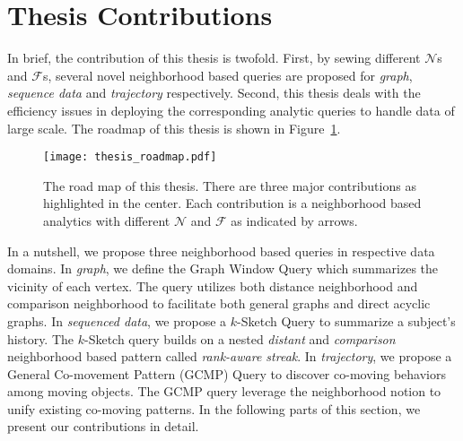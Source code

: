 \section{Thesis Contributions}
In brief, the contribution of this thesis is twofold.
First, by sewing different $\mathcal{N}$s and $\mathcal{F}$s, 
several novel neighborhood based queries are proposed for 
\emph{graph}, \emph{sequence data} and \emph{trajectory} respectively. 
Second, this thesis
deals with the efficiency issues in deploying the corresponding analytic queries to
handle data of large scale.
The roadmap of this thesis is shown in Figure~\ref{fig:thesis_roadmap}.
\begin{figure}[h]
\centering
\texttt{[image: thesis\_roadmap.pdf]}
\caption{The road map of this thesis. There are three major contributions as highlighted in the center. Each contribution
is a neighborhood based analytics with different $\mathcal{N}$ and $\mathcal{F}$ as indicated by arrows.} 
\label{fig:thesis_roadmap}
\end{figure}

In a nutshell, we propose three neighborhood based queries in respective data domains. 
In \emph{graph}, we define the Graph Window Query which summarizes the vicinity of each vertex.
The query utilizes both distance neighborhood and comparison neighborhood to facilitate both
general graphs and direct acyclic graphs.
%
In \emph{sequenced data}, we propose a $k$-Sketch Query to summarize a subject's history. The $k$-Sketch query builds on a nested \emph{distant} and \emph{comparison} neighborhood based pattern called \emph{rank-aware streak}.
%
In \emph{trajectory}, we propose a General Co-movement Pattern (GCMP) Query to discover co-moving behaviors among moving objects. The GCMP query leverage the neighborhood notion to unify existing co-moving patterns.
%
In the following parts of this section, we present our contributions in detail.


